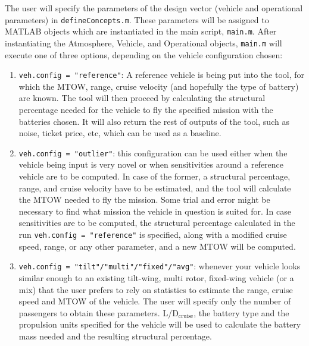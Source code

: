 

The user will specify the parameters of the design vector (vehicle and operational parameters) in \newline \texttt{defineConcepts.m}. These parameters will be assigned to MATLAB objects which are instantiated in the main script, \texttt{main.m}. After instantiating the Atmosphere, Vehicle, and Operational objects, \texttt{main.m} will execute one of three options, depending on the vehicle configuration chosen:

\begin{enumerate}
    \item \texttt{veh.config = "reference"}: A reference vehicle is being put into the tool, for which the MTOW, range, cruise velocity (and hopefully the type of battery) are known. The tool will then proceed by calculating the structural percentage needed for the vehicle to fly the specified mission with the batteries chosen. It will also return the rest of outputs of the tool, such as noise, ticket price, etc, which can be used as a baseline.
    \item \texttt{veh.config = "outlier"}: this configuration can be used either when the vehicle being input is very novel or when sensitivities around a reference vehicle are to be computed. In case of the former, a structural percentage, range, and cruise velocity have to be estimated, and the tool will calculate the MTOW needed to fly the mission. Some trial and error might be necessary to find what mission the vehicle in question is suited for. In case sensitivities are to be computed, the structural percentage calculated in the run \texttt{veh.config = "reference"} is specified, along with a modified cruise speed, range, or any other parameter, and a new MTOW will be computed.
    \item \texttt{veh.config = "tilt"/"multi"/"fixed"/"avg"}: whenever your vehicle looks similar enough to an existing tilt-wing, multi rotor, fixed-wing vehicle (or a mix) that the user prefers to rely on statistics to estimate the range, cruise speed and MTOW of the vehicle. The user will specify only the number of passengers to obtain these parameters. L/D$_{\text{cruise}}$, the battery type and the propulsion units specified for the vehicle will be used to calculate the battery mass needed and the resulting structural percentage.
    
\end{enumerate}


